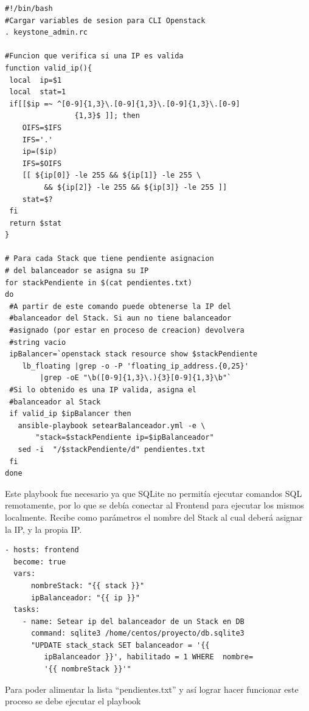 \documentclass[12pt,a4paper,oneside]{book}
\begin{document}
\vspace{0.5cm}
\begin{lstlisting}[style=codigobase,  caption= asignar\_balanceador\_a\_stack.sh]
#!/bin/bash
#Cargar variables de sesion para CLI Openstack
. keystone_admin.rc

#Funcion que verifica si una IP es valida
function valid_ip(){
 local  ip=$1
 local  stat=1
 if[[$ip =~ ^[0-9]{1,3}\.[0-9]{1,3}\.[0-9]{1,3}\.[0-9]
                {1,3}$ ]]; then
    OIFS=$IFS
    IFS='.'
    ip=($ip)
    IFS=$OIFS
    [[ ${ip[0]} -le 255 && ${ip[1]} -le 255 \
         && ${ip[2]} -le 255 && ${ip[3]} -le 255 ]]
    stat=$?
 fi
 return $stat
}

# Para cada Stack que tiene pendiente asignacion 
# del balanceador se asigna su IP
for stackPendiente in $(cat pendientes.txt)
do
 #A partir de este comando puede obtenerse la IP del 
 #balanceador del Stack. Si aun no tiene balanceador 
 #asignado (por estar en proceso de creacion) devolvera 
 #string vacio
 ipBalancer=`openstack stack resource show $stackPendiente
    lb_floating |grep -o -P 'floating_ip_address.{0,25}'
        |grep -oE "\b([0-9]{1,3}\.){3}[0-9]{1,3}\b"`
 #Si lo obtenido es una IP valida, asigna el 
 #balanceador al Stack
 if valid_ip $ipBalancer then
   ansible-playbook setearBalanceador.yml -e \
       "stack=$stackPendiente ip=$ipBalanceador"
   sed -i  "/$stackPendiente/d" pendientes.txt
 fi
done
\end{lstlisting}
\vspace{0.5cm}

Este playbook fue necesario ya que SQLite no permitía ejecutar comandos SQL remotamente, por lo que se debía conectar al Frontend para ejecutar los mismos localmente. Recibe como parámetros el nombre del Stack al cual deberá asignar la IP, y la propia IP.

\vspace{0.5cm}
\begin{lstlisting}[style=codigobase,  caption= asignar\_balanceador\_a\_stack.sh]
- hosts: frontend
  become: true
  vars:
      nombreStack: "{{ stack }}"
      ipBalanceador: "{{ ip }}"
  tasks:
    - name: Setear ip del balanceador de un Stack en DB
      command: sqlite3 /home/centos/proyecto/db.sqlite3
      "UPDATE stack_stack SET balanceador = '{{       
         ipBalanceador }}', habilitado = 1 WHERE  nombre= 
         '{{ nombreStack }}'"
\end{lstlisting}
\vspace{0.5cm}

Para poder alimentar la lista ``pendientes.txt'' y así lograr hacer funcionar este proceso se debe ejecutar el playbook
\end{document}
